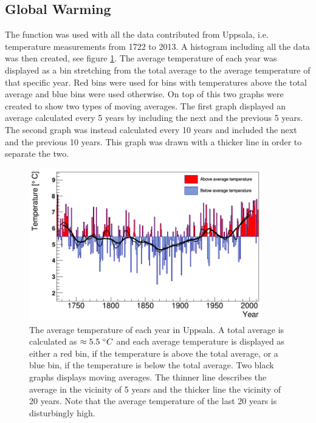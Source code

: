 \documentclass[a4paper]{article}
\begin{document}





\subsection{Global Warming}

The function was used with all the data contributed from Uppsala, i.e. temperature measurements from 1722 to 2013. A histogram including all the data was then created, see figure \ref{global_warming_figure}. The average temperature of each year was displayed as a bin stretching from the total average to the average temperature of that specific year. Red bins were used for bins with temperatures above the total average and blue bins were used otherwise. On top of this two graphs were created to show two types of moving averages. The first graph displayed an average calculated every 5 years by including the next and the previous 5 years. The second graph was instead calculated every 10 years and included the next and the previous 10 years. This graph was drawn with a thicker line in order to separate the two.

\begin{figure}[H]
\centering
\includegraphics[width=0.9\textwidth]{global_warming.png}
\caption{\label{global_warming_figure} The average temperature of each year in Uppsala. A total average is calculated as $\approx 5.5 \hspace{1mm} ^\circ C$ and each average temperature is displayed as either a red bin, if the temperature is above the total average, or a blue bin, if the temperature is below the total average. Two black graphs displays moving averages. The thinner line describes the average in the vicinity of 5 years and the thicker line the vicinity of 20 years. Note that the average temperature of the last 20 years is disturbingly high. }
\end{figure}
\end{document}
